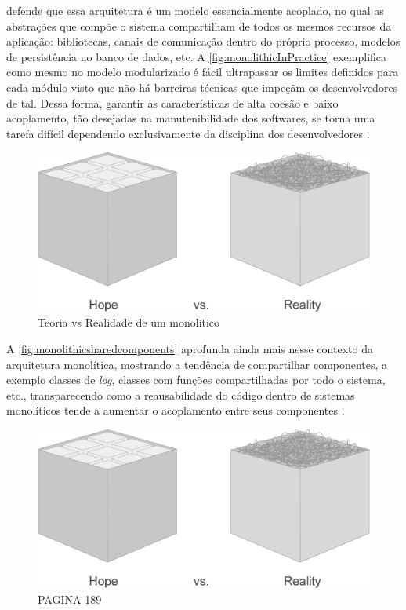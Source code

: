  defende que essa arquitetura é um modelo
essencialmente acoplado, no qual as abstrações que compõe o sistema compartilham de todos os mesmos
recursos da aplicação: bibliotecas, canais de comunicação dentro do próprio processo, modelos de
persistência no banco de dados, etc. A \autoref{fig:monolithicInPractice} exemplifica como mesmo no
modelo modularizado é fácil ultrapassar os limites definidos para cada módulo visto que não há barreiras
técnicas que impeçãm os desenvolvedores de tal. Dessa forma, garantir as características de alta coesão
e baixo acoplamento, tão desejadas na manutenibilidade dos softwares, se torna uma tarefa difícil dependendo
exclusivamente da disciplina dos desenvolvedores \cite{StefanTilkov:DontStartWithAMonolith,MartinFowler:MicroserviceTradeOffs}.

\begin{figure}[h]
  \centering
  \includegraphics[keepaspectratio=true,scale=0.4]{figuras/monolith-theory-practice.eps}
  \caption{Teoria vs Realidade de um monolítico\label{fig:monolithicInPractice} }
\end{figure}

A \autoref{fig:monolithicsharedcomponents} aprofunda ainda mais nesse contexto da arquitetura
monolítica, mostrando a tendência de compartilhar componentes, a exemplo classes de \textit{log},
classes com funções compartilhadas por todo o sistema, etc., transparecendo como a reausabilidade do
código dentro de sistemas monolíticos tende a aumentar o acoplamento entre seus componentes
\cite{Richards2020:FundamentalsOfSoftwareArchitecture}.

\begin{figure}[h]
  \centering
  \includegraphics[keepaspectratio=true,scale=0.4]{figuras/monolith-theory-practice.eps}
    \caption{PAGINA 189\label{fig:monolithicsharedcomponents} }
\end{figure}


